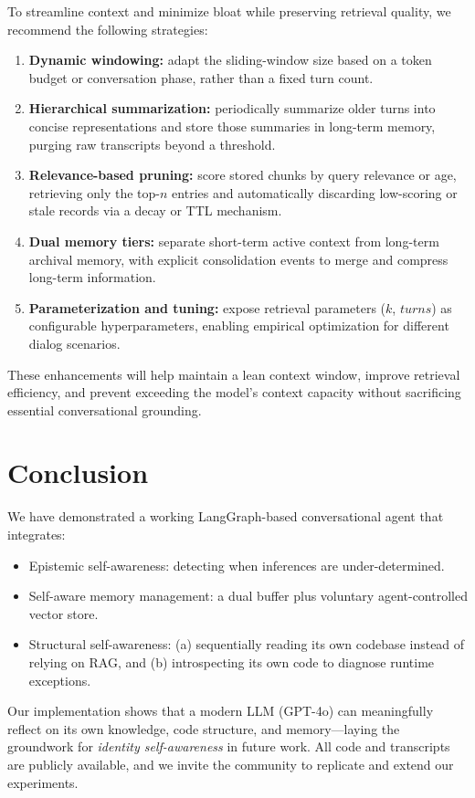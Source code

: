 \documentclass[11pt]{article}
\begin{document}
To streamline context and minimize bloat while preserving retrieval quality, we recommend the following strategies:
\begin{enumerate}[leftmargin=*]
  \item \textbf{Dynamic windowing:} adapt the sliding-window size based on a token budget or conversation phase, rather than a fixed turn count.
  \item \textbf{Hierarchical summarization:} periodically summarize older turns into concise representations and store those summaries in long-term memory, purging raw transcripts beyond a threshold.
  \item \textbf{Relevance-based pruning:} score stored chunks by query relevance or age, retrieving only the top-$n$ entries and automatically discarding low-scoring or stale records via a decay or TTL mechanism.
  \item \textbf{Dual memory tiers:} separate short-term active context from long-term archival memory, with explicit consolidation events to merge and compress long-term information.
  \item \textbf{Parameterization and tuning:} expose retrieval parameters ($k$, $\textit{turns}$) as configurable hyperparameters, enabling empirical optimization for different dialog scenarios.
\end{enumerate}
These enhancements will help maintain a lean context window, improve retrieval efficiency, and prevent exceeding the model’s context capacity without sacrificing essential conversational grounding.


\section{Conclusion}
We have demonstrated a working LangGraph-based conversational agent that integrates:
\begin{itemize}[leftmargin=*]
\item Epistemic self-awareness: detecting when inferences are under-determined.
\item Self-aware memory management: a dual buffer plus voluntary agent-controlled vector store.
\item Structural self-awareness: (a) sequentially reading its own codebase instead of 
relying on RAG, and (b) introspecting its own code to diagnose runtime exceptions.
\end{itemize}
Our implementation shows that a modern LLM (GPT-4o) can meaningfully reflect on its own knowledge, code structure, and memory—laying the groundwork for \emph{identity self-awareness} in future work. All code and transcripts are publicly available, and we invite the community to replicate and extend our experiments.  
\end{document}
